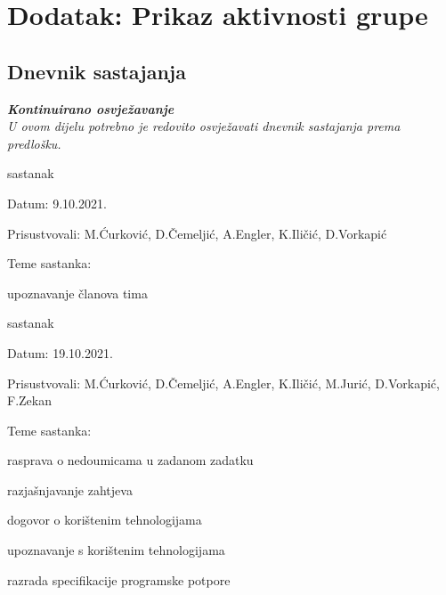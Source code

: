 \chapter*{Dodatak: Prikaz aktivnosti grupe}
		
		\section*{Dnevnik sastajanja}
		
		\textbf{\textit{Kontinuirano osvježavanje}}\\
		
		 \textit{U ovom dijelu potrebno je redovito osvježavati dnevnik sastajanja prema predlošku.}
		
		\begin{packed_enum}
			\item  sastanak
			
			\item[] \begin{packed_item}
				\item Datum: 9.10.2021.
				\item Prisustvovali: M.Ćurković, D.Čemeljić, A.Engler, K.Iličić, D.Vorkapić
				\item Teme sastanka:
				\begin{packed_item}
					\item  upoznavanje članova tima
				\end{packed_item}
			\end{packed_item}
			
			\item  sastanak
			\item[] \begin{packed_item}
				\item Datum: 19.10.2021.
				\item Prisustvovali: M.Ćurković, D.Čemeljić, A.Engler, K.Iličić, M.Jurić, D.Vorkapić, F.Zekan
				\item Teme sastanka:
				\begin{packed_item}
					\item  rasprava o nedoumicama u zadanom zadatku
					\item  razjašnjavanje zahtjeva
					\item  dogovor o korištenim tehnologijama
					\item  upoznavanje s korištenim tehnologijama
					\item  razrada specifikacije programske potpore
				\end{packed_item}
			\end{packed_item}
		

\end{packed_enum}
